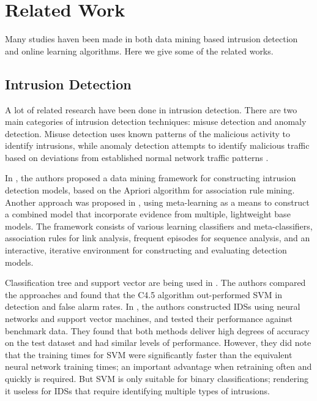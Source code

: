 \documentclass[runningheads]{llncs}
\begin{document}
	\section{Related Work} \label{related work}

	Many studies haven been made in both data mining based intrusion detection and online learning algorithms. Here we give some of the related works.

	\subsection{Intrusion Detection}
	
	A lot of related research have been done in intrusion detection. There are two main categories of intrusion detection techniques: misuse detection and anomaly detection. Misuse detection uses known patterns of the malicious activity to identify intrusions, while anomaly detection attempts to identify malicious traffic based on deviations from established normal network traffic patterns \cite{Ektefa2010}\cite{Liu2009}. 
	
	In \cite{Liu2009}, the authors proposed a data mining framework for constructing intrusion detection models, based on the Apriori algorithm for association rule mining. Another approach was proposed in \cite{WenkeLee1999}, using meta-learning as a means to construct a combined model that incorporate evidence from multiple, lightweight base models. The framework consists of various learning classifiers and meta-classifiers, association rules for link analysis, frequent episodes for sequence analysis, and an interactive, iterative environment for constructing and evaluating detection models. 
	
	Classification tree and support vector are being used in \cite{Ektefa2010}. The authors compared the approaches and found that the C4.5 algorithm out-performed SVM in detection and false alarm rates. In \cite{Mukkamala2002}, the authors constructed IDSs using neural networks and support vector machines, and tested their performance against benchmark data. They found that both methods deliver high degrees of accuracy on the test dataset and had similar levels of performance. However, they did note that the training times for SVM were significantly faster than the equivalent neural network training times; an important advantage when retraining often and quickly is required. But SVM is only suitable for binary classifications; rendering it useless for IDSs that require identifying multiple types of intrusions. 
	
\end{document}
